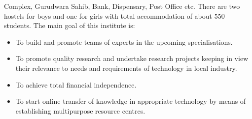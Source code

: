 Complex, Gurudwara Sahib, Bank, Dispensary, Post Office etc. There are two hostels
for boys and one for girls with total accommodation of about 550 students. The main
goal of this institute is:\\
\begin{itemize}
\item To build and promote teams of experts in the upcoming specialisations.
\item To promote quality research and undertake research projects keeping in view their relevance to needs and requirements of technology in local industry.
\item To achieve total financial independence.
\item To start online transfer of knowledge in appropriate technology by means of establishing multipurpose resource centres.
\end{itemize}


